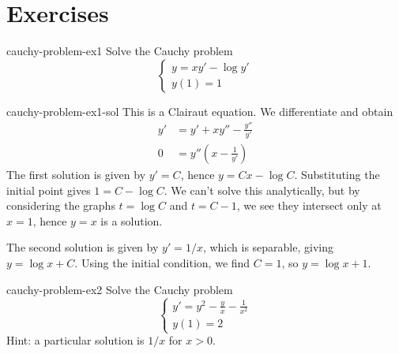 \documentclass[preview]{standalone}
\begin{document}
\genpage

\section{Exercises}

\begin{snippetexercise}{cauchy-problem-ex1}{}
    Solve the Cauchy problem
    \[
        \begin{cases}
            y = xy' - \log y' \\
            y(1) = 1
        \end{cases}
    \]
\end{snippetexercise}

\begin{snippetsolution}{cauchy-problem-ex1-sol}{}
    This is a Clairaut equation. We differentiate and obtain
    \begin{align*}
        y' &= y' + xy'' - \frac{y''}{y'} \\
        0 &= y''\left(x - \frac{1}{y'}\right)
    \end{align*}
    The first solution is given by \(y' = C\), hence \(y = Cx - \log C\).
    Substituting the initial point gives \(1 = C - \log C\). We can't solve this analytically,
    but by considering the graphs \(t = \log C\) and \(t = C - 1\), we see they intersect only at \(x = 1\),
    hence \(y = x\) is a solution.

    The second solution is given by \(y' = 1/x\), which is separable, giving \(y = \log x + C\).
    Using the initial condition, we find \(C = 1\), so \(y = \log x + 1\).
\end{snippetsolution}

\begin{snippetexercise}{cauchy-problem-ex2}{}
    Solve the Cauchy problem
    \[
        \begin{cases}
            y' = y^2 - \frac{y}{x} - \frac{1}{x^2}     \\
            y(1) = 2
        \end{cases}
    \]
    Hint: a particular solution is \(1/x\) for \(x > 0\).
\end{snippetexercise}
\end{document}
